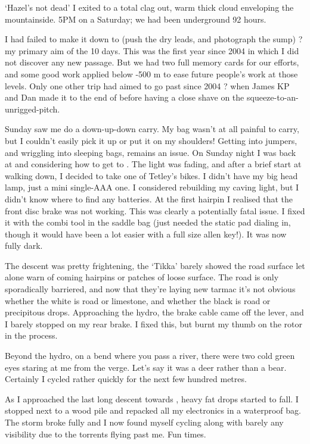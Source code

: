 `Hazel's not dead'
I exited to a total clag out, warm thick cloud enveloping the mountainside.
5PM on a Saturday; we had been underground 92 hours.

I had failed to make it down to  (push the dry leads, and photograph the sump) ? my primary aim of the 10 days. This was the first year since 2004 in which I did not discover any new passage. But we had two full memory cards for our efforts, and some good work applied below -500 m to ease future people's work at those levels. Only one other trip had aimed to go past  since 2004 ? when James KP and Dan made it to the end of  before having a close shave on the squeeze-to-an-unrigged-pitch.

Sunday saw me do a down-up-down carry. My bag wasn't at all painful to carry, but I couldn't easily pick it up or put it on my shoulders! Getting into jumpers, and wriggling into sleeping bags, remains an issue.
On Sunday night I was back at  and considering how to get to . The light was fading, and after a brief start at walking down, I decided to take one of Tetley's bikes. I didn't have my big head lamp, just a mini single-AAA one. I considered rebuilding my caving light, but I didn't know where to find any batteries.
At the first hairpin I realised that the front disc brake was not working. This was clearly a potentially fatal issue.
I fixed it with the combi tool in the saddle bag (just needed the static pad dialing in, though it would have been a lot easier with a full size allen key!). It was now fully dark.

The descent was pretty frightening, the `Tikka' barely showed the road surface let alone warn of coming hairpins or patches of loose surface. The road is only sporadically barriered, and now that they're laying new tarmac it's not obvious whether the white is road or limestone, and whether the black is road or precipitous drops. Approaching the hydro, the brake cable came off the lever, and I barely stopped on my rear brake. I fixed this, but burnt my thumb on the rotor in the process.

Beyond the hydro, on a bend where you pass a river, there were two cold green eyes staring at me from the verge. Let's say it was a deer rather than a bear. Certainly I cycled rather quickly for the next few hundred metres.

As I approached the last long descent towards , heavy fat drops started to fall. I stopped next to a wood pile and repacked all my electronics in a waterproof bag. The storm broke fully and I now found myself cycling along with barely any visibility due to the torrents flying past me. Fun times.

